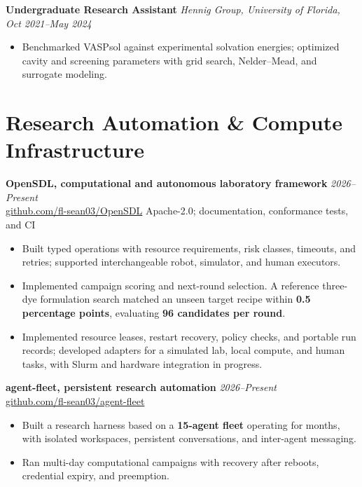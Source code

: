 \documentclass[letterpaper,10pt]{article}
\newcommand{\keep}{\needspace{4\baselineskip}}
\newcommand{\keepsection}{\needspace{6\baselineskip}}
\begin{document}
\keep\textbf{Undergraduate Research Assistant} \hfill \textit{Hennig Group, University of Florida, Oct 2021--May 2024}
\begin{itemize}
    \item Benchmarked VASPsol against experimental solvation energies; optimized cavity and screening parameters with grid search, Nelder--Mead, and surrogate modeling.
\end{itemize}

\keepsection\section*{Research Automation \& Compute Infrastructure}
\textbf{OpenSDL, computational and autonomous laboratory framework} \hfill \textit{2026--Present}\\
\href{https://github.com/fl-sean03/OpenSDL}{github.com/fl-sean03/OpenSDL} \;\textbar\; Apache-2.0; documentation, conformance tests, and CI
\begin{itemize}
    \item Built typed operations with resource requirements, risk classes, timeouts, and retries; supported interchangeable robot, simulator, and human executors.
    \item Implemented campaign scoring and next-round selection. A reference three-dye formulation search matched an unseen target recipe within \textbf{0.5 percentage points}, evaluating \textbf{96 candidates per round}.
    \item Implemented resource leases, restart recovery, policy checks, and portable run records; developed adapters for a simulated lab, local compute, and human tasks, with Slurm and hardware integration in progress.
\end{itemize}

\keep\textbf{agent-fleet, persistent research automation} \hfill \textit{2026--Present}\\
\href{https://github.com/fl-sean03/agent-fleet}{github.com/fl-sean03/agent-fleet}
\begin{itemize}
    \item Built a research harness based on a \textbf{15-agent fleet} operating for months, with isolated workspaces, persistent conversations, and inter-agent messaging.
    \item Ran multi-day computational campaigns with recovery after reboots, credential expiry, and preemption.
\end{itemize}
\end{document}
